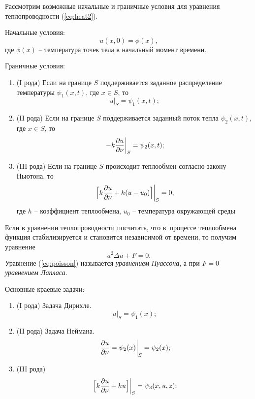 Рассмотрим возможные начальные и граничные условия для уравнения теплопроводности (\ref{eq:heat2}).

Начальные условия:
\begin{equation}\label{eq:heat_init_cond}
	u(x,0) = \phi(x),
\end{equation}
где $\phi(x)$ -- температура точек тела в начальный момент времени.

Граничные условия:
\begin{enumerate}
	\item (I рода) Если на границе $S$ поддерживается заданное распределение температуры $\psi_1(x,t)$, где $x \in S$, то
	\begin{equation}\label{eq:heat_bound_cond1}
		\left. u
		\right|_S^{} = \psi_1(x,t);
	\end{equation}

	\item (II рода) Если на границе $S$ поддерживается заданный поток тепла $\psi_2(x,t)$, где $x \in S$, то
	\begin{equation}\label{eq:heat_bound_cond2}
		\left. -k\frac{\partial u}{\partial\nu}
		\right|_S^{} = \psi_2(x,t);
	\end{equation}

	\item (III рода) Если на границе $S$ происходит теплообмен согласно закону Ньютона, то
	\begin{equation}\label{eq:heat_bound_cond3}
		\left. \Bigl[ k\frac{\partial u}{\partial\nu} + h(u-u_0) \Bigr]
		\right|_S^{} = 0,
	\end{equation}
	где $h$ -- коэффициент теплообмена, $u_0$ -- температура окружающей среды
\end{enumerate}

Если в уравнении теплопроводности посчитать, что в~процессе теплообмена функция стабилизируется и становится независимой от времени, то получим уравнение
\begin{equation}\label{eq:poisson}
	a^2\Delta u + F = 0.
\end{equation}
Уравнение (\ref{eq:poisson}) называется \emph{уравнением Пуассона}, а при $F = 0$ \emph{уравнением Лапласа}.

Основные краевые задачи:
\begin{enumerate}
	\item (I рода) Задача Дирихле.
	\[  
		\left. u
		\right|_S^{} = \psi_1(x);
	\]

	\item (II рода) Задача Неймана.
	\[  
		\left. \frac{\partial u}{\partial\nu} = \psi_2(x)
		\right|_S^{} = \psi_2(x);
	\]

	\item (III рода) 
	\[  
		\left. \Bigl[ k\frac{\partial u}{\partial\nu} + hu \Bigr]
		\right|_S^{} = \psi_3(x,u,z);
	\]
\end{enumerate}